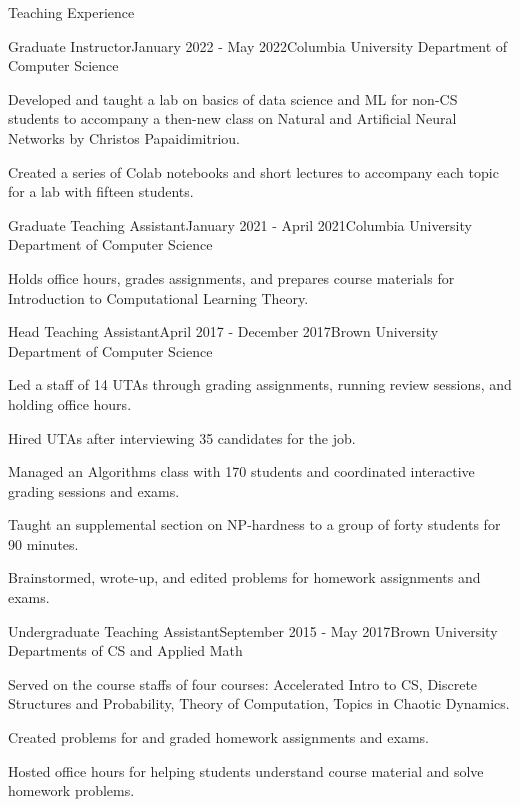 \documentclass{resume} %
\begin{document}
\begin{rSection}{Teaching Experience}
\begin{rSubsection}{Graduate Instructor}{January 2022 - May 2022}{Columbia University Department of Computer Science}{}
\item Developed and taught a lab on basics of data science and ML for non-CS students to accompany a then-new class on Natural and Artificial Neural Networks by Christos Papaidimitriou.
\item Created a series of Colab notebooks and short lectures to accompany each topic for a lab with fifteen students.
\end{rSubsection}


\begin{rSubsection}{Graduate Teaching Assistant}{January 2021 - April 2021}{Columbia University Department of Computer Science}{}
\item Holds office hours, grades assignments, and prepares course materials for Introduction to Computational Learning Theory.
\end{rSubsection}

\begin{rSubsection}{Head Teaching Assistant}{April 2017 - December 2017}{Brown University Department of Computer Science}{}
\item Led a staff of 14 UTAs through grading assignments, running review sessions, and holding office hours.
\item Hired UTAs after interviewing 35 candidates for the job.
\item Managed an Algorithms class with 170 students and coordinated interactive grading sessions and exams.
\item Taught an supplemental section on NP-hardness to a group of forty students for 90 minutes.
\item Brainstormed, wrote-up, and edited problems for homework assignments and exams. 
\end{rSubsection}

\begin{rSubsection}{Undergraduate Teaching Assistant}{September 2015 - May 2017}{Brown University Departments of CS and Applied Math}{}
\item Served on the course staffs of four courses: Accelerated Intro to CS, Discrete Structures and Probability, Theory of Computation, Topics in Chaotic Dynamics.
\item Created problems for and graded homework assignments and exams.
\item Hosted office hours for helping students understand course material and solve homework problems.
\end{rSubsection}


\end{rSection}
\end{document}
